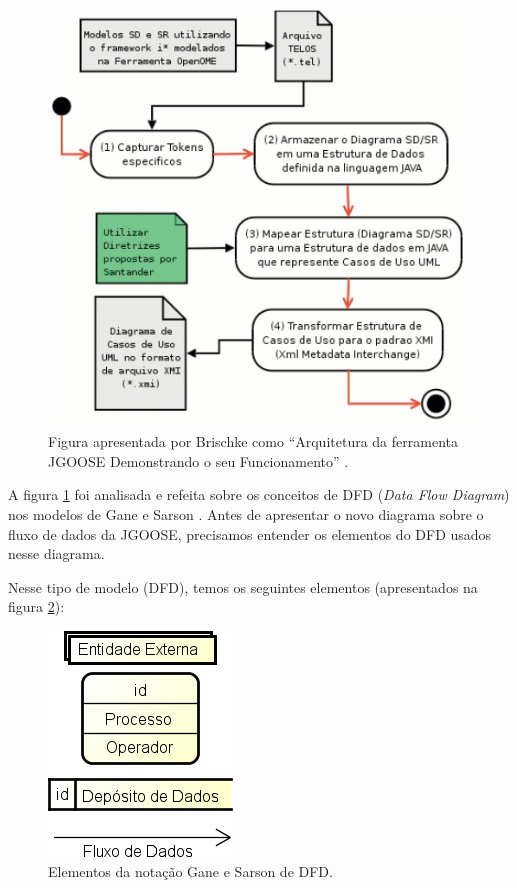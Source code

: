             \begin{figure}[h!]
                \centering
                    \includegraphics[scale=1]{Figuras/jgoose-arquitetura.jpg}
                    \caption{Figura apresentada por Brischke como ``Arquitetura da ferramenta JGOOSE Demonstrando o seu Funcionamento'' \cite{brischke2011melhorando}.}
                    \label{fig:jgoose-arquitetura}
            \end{figure}

            A figura \ref{fig:jgoose-arquitetura} foi analisada e refeita sobre os conceitos de DFD (\emph{Data Flow Diagram}) nos modelos de Gane e Sarson \cite{gane1977structured}.
            Antes de apresentar o novo diagrama sobre o fluxo de dados da JGOOSE, precisamos entender os elementos do DFD usados nesse diagrama.
            
            Nesse tipo de modelo (DFD), temos os seguintes elementos (apresentados na figura \ref{fig:dfd-captions}):

                \begin{figure}[h!]
                    \centering
                        \includegraphics[scale=0.8]{Figuras/dfd-captions.png}
                        \caption{Elementos da notação Gane e Sarson \cite{gane1977structured} de DFD.}
                        \label{fig:dfd-captions}
                \end{figure}

